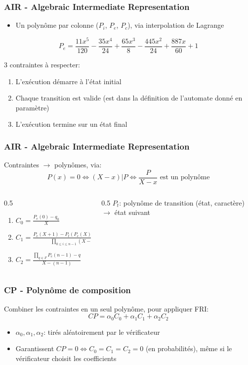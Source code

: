 \documentclass{beamer}
\begin{document}
\begin{frame}
\frametitle{AIR - Algebraic Intermediate Representation}
\begin{itemize}
    \item Un polynôme par colonne ($P_i$, $P_e$, $P_c$), via interpolation de Lagrange
\end{itemize}

$$P_e = \frac{11x^5}{120} - \frac{35x^4}{24} + \frac{65x^3}{8} - \frac{445x^2}{24} + \frac{887x}{60} + 1$$

3 contraintes à respecter:
\begin{enumerate}
  \item L'exécution démarre à l'état initial
  \item Chaque transition est valide (est dans la définition de l'automate donné en paramètre)
  \item L'exécution termine sur un état final
\end{enumerate}
\end{frame}
\begin{frame}
\frametitle{AIR - Algebraic Intermediate Representation}
Contraintes $\to$ polynômes, via:
$$P(x) = 0 \iff (X - x) | P \iff \frac{P}{X-x} \text{ est un polynôme}$$
\begin{columns}[T]
\begin{column}{0.5\textwidth}
\begin{enumerate}
  \item $C_0 = \frac{P_e(0) - q_0}{X}$
  \item $C_1 = \frac{P_e(X+1) - P_t(P_e(X), P_c(X))}{\prod_{0\le i \le n-1}{(X-i)}}$
  \item $C_2 = \frac{\prod_{q\in F}{P_e(n-1) - q}}{X-(n-1)}$
\end{enumerate}
\end{column}
\begin{column}{0.5\textwidth}
$P_t$: polynôme de transition (état, caractère) $\to$ état suivant
\end{column}
\end{columns}
\end{frame}

\begin{frame}
\frametitle{CP - Polynôme de composition}
Combiner les contraintes en un seul polynôme, pour appliquer FRI:
$$CP = \alpha_0 C_0 + \alpha_1 C_1 + \alpha_2 C_2$$

\begin{itemize}
    \item $\alpha_0, \alpha_1, \alpha_2$: tirés aléatoirement par le vérificateur
    \item Garantissent $CP = 0 \iff C_0 = C_1 = C_2 = 0$ (en probabilités), même si le vérificateur choisit les coefficients
\end{itemize}
\end{frame}
\end{document}

